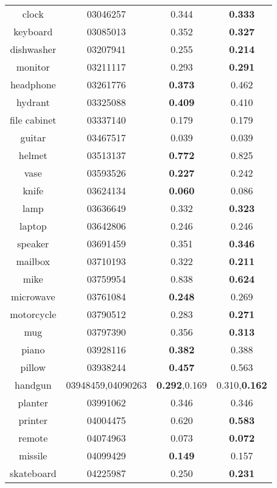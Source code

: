 \begin{table}
\begin{tabular}{c c c c}
		clock & 03046257 & 0.344 & {\color{blue}\textbf{0.333}}\\
		keyboard & 03085013 & 0.352 & {\color{blue}\textbf{0.327}}\\
		dishwasher & 03207941 & 0.255 & {\color{blue}\textbf{0.214}}\\
		monitor & 03211117 & 0.293 & {\color{blue}\textbf{0.291}}\\
		headphone & 03261776 & {\color{blue}\textbf{0.373}} & 0.462\\
		hydrant & 03325088 & {\color{blue}\textbf{0.409}} & 0.410\\
		file cabinet& 03337140 & 0.179 & 0.179\\
		guitar & 03467517 & 0.039 & 0.039\\
		helmet & 03513137 & {\color{blue}\textbf{0.772}} & 0.825\\
		vase & 03593526 & {\color{blue}\textbf{0.227}} & 0.242\\
		knife & 03624134 & {\color{blue}\textbf{0.060}}  & 0.086\\
		lamp & 03636649 & 0.332 & {\color{blue}\textbf{0.323}}\\
		laptop & 03642806 & 0.246 & 0.246\\
		speaker & 03691459 & 0.351 & {\color{blue}\textbf{0.346}}\\
		mailbox & 03710193 & 0.322 & {\color{blue}\textbf{0.211}}\\
		mike & 03759954 & 0.838 & {\color{blue}\textbf{0.624}}\\
		microwave & 03761084 & {\color{blue}\textbf{0.248}} & 0.269\\
		motorcycle & 03790512 & 0.283 & {\color{blue}\textbf{0.271}}\\
		mug & 03797390 & 0.356 & {\color{blue}\textbf{0.313}}\\
		piano & 03928116 & {\color{blue}\textbf{0.382}} & 0.388\\
		pillow & 03938244 & {\color{blue}\textbf{0.457}} & 0.563\\
		handgun & 03948459,04090263 & {\color{blue}\textbf{0.292}},0.169 & 0.310,{\color{blue}\textbf{0.162}}\\
		planter & 03991062 & 0.346 & 0.346\\
		printer & 04004475 & 0.620 & {\color{blue}\textbf{0.583}}\\
		remote & 04074963 & 0.073 & {\color{blue}\textbf{0.072}}\\
		missile & 04099429 & {\color{blue}\textbf{0.149}} & 0.157\\
		skateboard & 04225987 & 0.250 & {\color{blue}\textbf{0.231}}\\

\end{tabular}
\end{table}
